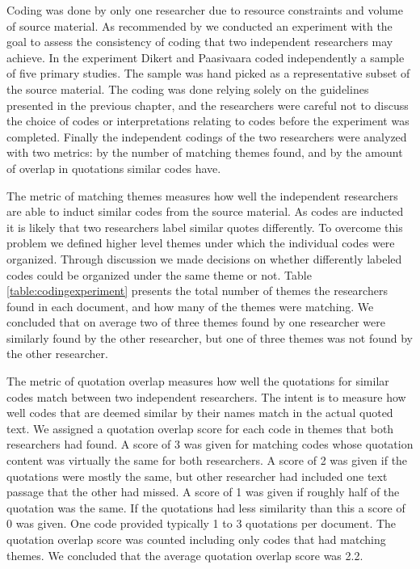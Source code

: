 Coding was done by only one researcher due to resource constraints and volume of
source material. As recommended by \citet{Kitchenham2007} we conducted
an experiment with the goal to assess the consistency of coding that two
independent researchers may achieve.
In the experiment Dikert and Paasivaara coded independently a sample of five
primary studies. The sample was hand picked as a representative subset of the
source material. The coding was done relying solely on the guidelines presented
in the previous chapter, and the researchers were careful not to discuss the
choice of codes or interpretations relating to codes before the experiment was
completed. Finally the independent codings of the two researchers were analyzed
with two metrics: by the number of matching themes found, and by the amount of
overlap in quotations similar codes have.

The metric of matching themes measures how well the independent researchers are
able to induct similar codes from the source material. As codes are inducted it
is likely that two researchers label similar quotes differently. To overcome
this problem we defined higher level themes under which the individual codes
were organized. Through discussion we made decisions on whether differently
labeled codes could be organized under the same theme or not. Table
\ref{table:codingexperiment} presents the total number of themes the researchers
found in each document, and how many of the themes were matching. We concluded
that on average two of three themes found by one researcher were similarly found
by the other researcher, but one of three themes was not found by the other
researcher.

The metric of quotation overlap measures how well the quotations for similar
codes match between two independent researchers. The intent is to measure how
well codes that are deemed similar by their names match in the actual quoted
text. We assigned a quotation overlap score for each code in themes that both
researchers had found. A score of 3 was given for matching codes whose quotation
content was virtually the same for both researchers. A score of 2 was given if
the quotations were mostly the same, but other researcher had included one text
passage that the other had missed. A score of 1 was given if roughly half of the
quotation was the same. If the quotations had less similarity than this a score
of 0 was given. One code provided typically 1 to 3 quotations per document. The
quotation overlap score was counted including only codes that had matching
themes. We concluded that the average quotation overlap score was 2.2.

